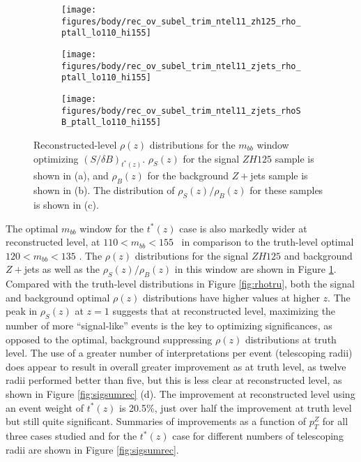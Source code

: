\begin{figure}[!htbp]\captionsetup{justification=centering}
\begin{center}
\begin{subfigure}[t]{18pc}\centering\texttt{[image: figures/body/rec\_ov\_subel\_trim\_ntel11\_zh125\_rho\_ptall\_lo110\_hi155]}\caption{}\end{subfigure}
\begin{subfigure}[t]{18pc}\centering\texttt{[image: figures/body/rec\_ov\_subel\_trim\_ntel11\_zjets\_rho\_ptall\_lo110\_hi155]}\caption{}\end{subfigure}
\begin{subfigure}[t]{18pc}\centering\texttt{[image: figures/body/rec\_ov\_subel\_trim\_ntel11\_zjets\_rhoSB\_ptall\_lo110\_hi155]}\caption{}\end{subfigure}
\caption{\label{fig:rhorec}Reconstructed-level $\rho\left(z\right)$ distributions for the $m_{bb}$ window optimizing $\left(S/\delta B\right)_{t^*\left(z\right)}$.  $\rho_S\left(z\right)$ for the signal $ZH125$ sample is shown in (a), and $\rho_B\left(z\right)$ for the background $Z+$jets sample is shown in (b).  The distribution of $\rho_S\left(z\right)/\rho_B\left(z\right)$ for these samples is shown in (c).}
\end{center}
\end{figure}

The optimal $m_{bb}$ window for the $t^*\left(z\right)$ case is also markedly wider at reconstructed level, at $110<m_{bb}<155$ \GeV\ in comparison to the truth-level optimal $120<m_{bb}<135$ \GeV.  The $\rho\left(z\right)$ distributions for the signal $ZH125$ and background $Z+$jets as well as the $\rho_S\left(z\right)/\rho_B\left(z\right)$ in this window are shown in Figure \ref{fig:rhorec}.  Compared with the truth-level distributions in Figure \ref{fig:rhotru}, both the signal and background optimal $\rho\left(z\right)$ distributions have higher values at higher $z$.  The peak in $\rho_S\left(z\right)$ at $z=1$ suggests that at reconstructed level, maximizing the number of more ``signal-like'' events is the key to optimizing significances, as opposed to the optimal, background suppressing  $\rho\left(z\right)$ distributions at truth level.  The use of a greater number of interpretations per event (telescoping radii) does appear to result in overall greater improvement as at truth level, as twelve radii performed better than five, but this is less clear at reconstructed level, as shown in Figure \ref{fig:sigsumrec} (d).  The improvement at reconstructed level using an event weight of $t^*\left(z\right)$ is 20.5\%, just over half the improvement at truth level but still quite significant.  Summaries of improvements as a function of $p_T^Z$ for all three cases studied and for the $t^*\left(z\right)$ case for different numbers of telescoping radii are shown in Figure \ref{fig:sigsumrec}.

